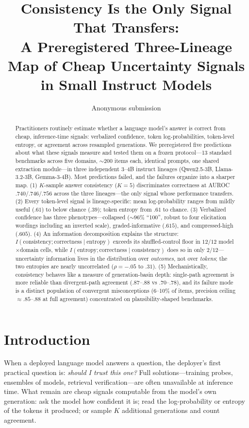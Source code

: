 \documentclass[10pt]{article}
\title{\bfseries Consistency Is the Only Signal That Transfers:\\
A Preregistered Three-Lineage Map of Cheap Uncertainty Signals\\
in Small Instruct Models}
\author{Anonymous submission}
\date{}
\begin{document}
\maketitle

\begin{abstract}
Practitioners routinely estimate whether a language model's answer is correct from cheap,
inference-time signals: verbalized confidence, token log-probabilities, token-level entropy,
or agreement across resampled generations. We preregistered five predictions about what these
signals measure and tested them on a frozen protocol---13 standard benchmarks across five
domains, ${\sim}200$ items each, identical prompts, one shared extraction module---in three
independent 3--4B instruct lineages (Qwen2.5-3B, Llama-3.2-3B, Gemma-3-4B). Most predictions
failed, and the failures organize into a sharper map. (1) $K$-sample answer consistency
($K{=}5$) discriminates correctness at AUROC $.740/.746/.756$ across the three lineages---the
only signal whose performance transfers. (2) Every token-level signal is lineage-specific:
mean log-probability ranges from mildly useful ($.61$) to below chance ($.39$); token entropy
from $.61$ to chance. (3) Verbalized confidence has three phenotypes---collapsed
(${\sim}96\%$ ``100'', robust to four elicitation wordings including an inverted scale),
graded-informative ($.615$), and compressed-high ($.605$). (4) An information decomposition
explains the structure: $I(\text{consistency};\text{correctness}\mid\text{entropy})$ exceeds
its shuffled-control floor in $12/12$ model$\times$domain cells, while
$I(\text{entropy};\text{correctness}\mid\text{consistency})$ does so in only $2/12$---
uncertainty information lives in the distribution over \emph{outcomes}, not over \emph{tokens};
the two entropies are nearly uncorrelated ($\rho = -.05$ to $.31$). (5) Mechanistically,
consistency behaves like a measure of generation-basin depth: single-path agreement is more
reliable than divergent-path agreement ($.87$--$.88$ vs $.70$--$.78$), and its failure mode is
a distinct population of convergent misconceptions (6--10\% of items, precision ceiling
${\approx}.85$--$.88$ at full agreement) concentrated on plausibility-shaped benchmarks.
\end{abstract}

\section{Introduction}
When a deployed language model answers a question, the deployer's first practical question is:
\emph{should I trust this one?} Full solutions---training probes, ensembles of models,
retrieval verification---are often unavailable at inference time. What remain are cheap signals
computable from the model's own generation: ask the model how confident it is; read the
log-probability or entropy of the tokens it produced; or sample $K$ additional generations and
count agreement.
\end{document}
